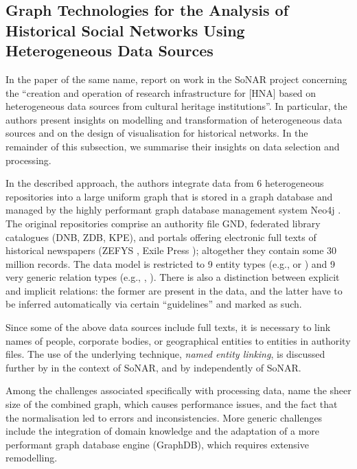 \subsection{Graph Technologies for the Analysis of Historical Social Networks Using Heterogeneous Data Sources}

In the paper of the same name, \textcite{Menzel2020} report on
work in the \gls{SoNAR} project concerning the 
\enquote{creation and operation of research infrastructure
for [\gls{HNA}] based on heterogeneous data sources from cultural heritage institutions}.
In particular, the authors present insights on modelling and transformation
of heterogeneous data sources and on the design of visualisation for historical networks.
In the remainder of this subsection,
we summarise their insights on data selection and processing.

In the described approach, the authors integrate data from 6 heterogeneous repositories
into a large uniform graph that is stored in a graph database
and managed by the highly performant graph database management system Neo4j \autocite{Neo4j}.
The original repositories comprise an authority file \gls{GND},
federated library catalogues (\gls{DNB}, \gls{ZDB}, \gls{KPE}), %
and portals offering electronic full texts of historical newspapers 
%
(\gls{ZEFYS} \autocite{ZEFYS}, Exile Press \autocite{ExilePress});
altogether they contain some 30 million records.
The data model is restricted to 9 entity types (e.g.,  or )
and 9 very generic relation types (e.g., , ).
There is also a distinction between explicit and implicit relations:
the former are present in the data, and the latter have to be inferred automatically via
certain \enquote{guidelines} and marked as such.

Since some of the above data sources include full texts,
it is necessary to link names of people, corporate bodies, or geographical entities
to entities in authority files. The use of the underlying technique,
\emph{named entity linking}, is discussed further by \textcite{Menzel2021}
in the context of \gls{SoNAR},
and by \textcite{Meiners2022} independently of \gls{SoNAR}.

Among the challenges associated specifically with processing data,
\textcite{Menzel2020} name
the sheer size of the combined graph, which causes performance issues,
and the fact that the normalisation led to errors and inconsistencies.
More generic challenges include the integration of domain knowledge
and the adaptation of a more performant graph database engine (GraphDB),
which requires extensive remodelling.

